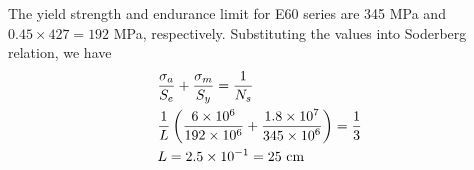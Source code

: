 \documentclass[10pt, svgnames]{beamer}
\begin{document}
\begin{frame}[label={sec:org0cadab6}]{}
  The yield strength and endurance limit for E60 series are 345 MPa and \(0.45 \times 427 = 192\) MPa, respectively. Substituting the values into Soderberg relation, we have
\[\begin{gathered}
      \frac{{{\sigma _a}}}{{{S_e}}} + \frac{{{\sigma _m}}}{{{S_y}}} = \frac{1}{{{N_s}}} \hfill \\
      {1 \over L} \left( \frac{6 \times 10^6}{192 \times 10^6} + \frac{1.8 \times {10}^7}{345 \times {10}^6} \right) = \frac{1}{3} \hfill \\
      L = 2.5 \times {10^{ - 1}} = 25\text{ cm} \hfill \\ 
    \end{gathered} \]
\end{frame}
\end{document}
